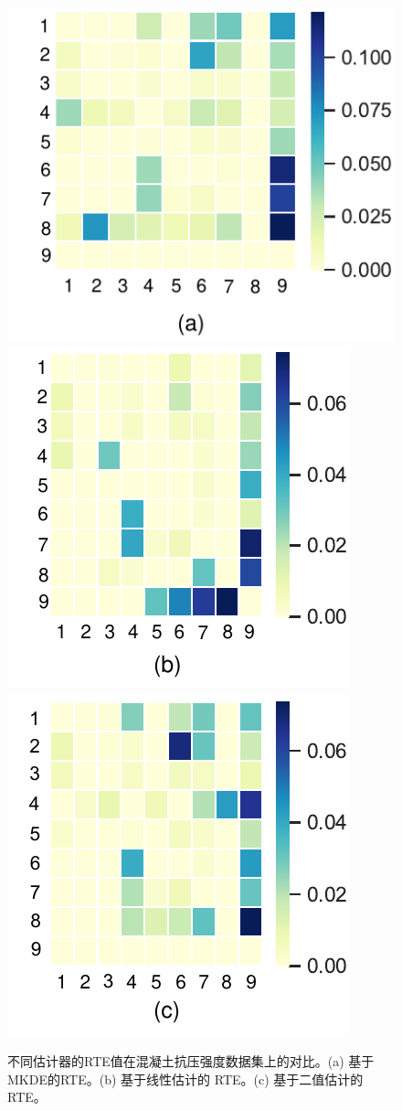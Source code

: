 \begin{figure}[!ht]
\begin{center}
\includegraphics[scale=0.5]{./ch3/fig3_9.pdf}
\includegraphics[scale=0.5]{./ch3/fig3_10.pdf}
\includegraphics[scale=0.5]{./ch3/fig3_11.pdf}
\caption{不同估计器的RTE值在混凝土抗压强度数据集上的对比。(a) 基于MKDE的RTE。(b) 基于线性估计的 RTE。(c) 基于二值估计的RTE。} \label{figure8}
\end{center}
\end{figure}

